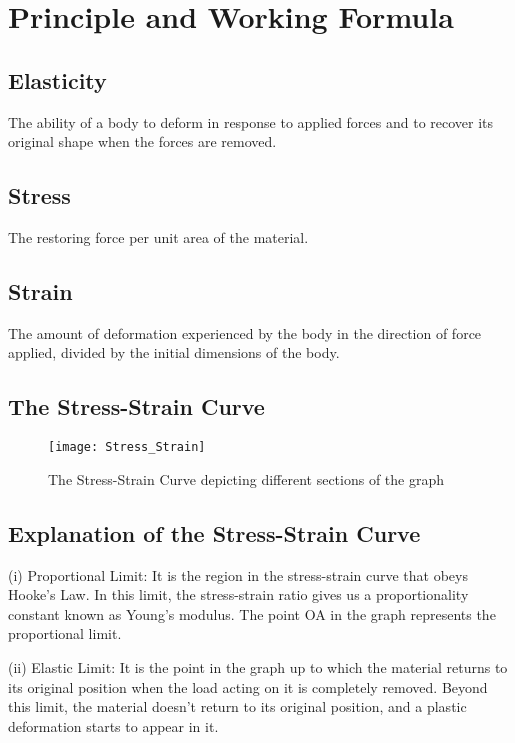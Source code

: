 \documentclass[12pt]{article}
\begin{document}
	\section{Principle and Working Formula}
	
	\subsection{Elasticity }The ability of a body to deform in response to applied forces and to recover its original shape when the forces are removed.
	
	\subsection{Stress }The restoring force per unit area of the material.
	
	\subsection{Strain }The amount of deformation experienced by the body in the direction of force applied, divided by the initial dimensions of the body.
	
	\subsection{The Stress-Strain Curve }
	
	\begin{figure}[H]
		\centering
		\texttt{[image: Stress\_Strain]}
		\caption{The Stress-Strain Curve depicting different sections of the graph}
		\label{figure:curve}
	\end{figure}

	\subsection{Explanation of the Stress-Strain Curve }
	
	(i) Proportional Limit: 
	It is the region in the stress-strain curve that obeys Hooke’s Law. In this limit, the stress-strain ratio gives us a proportionality constant known as Young’s modulus. The point OA in the graph represents the proportional limit.
	
	(ii) Elastic Limit: 
	It is the point in the graph up to which the material returns to its original position when the load acting on it is completely removed. Beyond this limit, the material doesn’t return to its original position, and a plastic deformation starts to appear in it.
	
\end{document}
